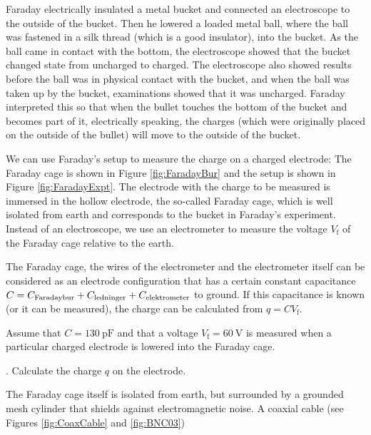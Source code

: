 \documentclass[../Elmag-labhefte-2020.tex]{subfiles}
\begin{document}
Faraday electrically insulated a metal bucket and connected an electroscope to the outside of the bucket. Then he lowered a loaded metal ball, where the ball was fastened in a silk thread (which is a good insulator), into the bucket. As the ball came in contact with the bottom, the electroscope showed that the bucket changed state from uncharged to charged. The electroscope also showed results before the ball was in physical contact with the bucket, and when the ball was taken up by the bucket, examinations showed that it was uncharged. Faraday interpreted this so that when the bullet touches the bottom of the bucket and becomes part of it, electrically speaking, the charges (which were originally placed on the outside of the bullet) will move to the outside of the bucket.

We can use Faraday's setup to measure the charge on a charged electrode: The Faraday cage is shown in Figure \ref{fig:FaradayBur} and the setup is shown in Figure \ref{fig:FaradayExpt}. The electrode with the charge to be measured is immersed in the hollow electrode, the so-called Faraday cage, which is well isolated from earth and corresponds to the bucket in Faraday's experiment. Instead of an electroscope, we use an electrometer to measure the voltage $V_\text{f}$ of the Faraday cage relative to the earth.


The Faraday cage, the wires of the electrometer and the electrometer itself can be considered as an electrode configuration that has a certain constant capacitance $C = C_\text{Faradaybur} + C_{\rm ledninger} + C_\text{elektrometer}$ to ground. If this capacitance is known (or it can be measured), the charge can be calculated from $q = C V_\text{f}$.

Assume that $C = \SI{130}{\pico\farad}$ and that a voltage $V_\text{f} = \SI{60}{\volt}$ is measured when a particular charged electrode is lowered into the Faraday cage.

{. Calculate the charge $q$ on the electrode.}

The Faraday cage itself is isolated from earth, but surrounded by a grounded mesh cylinder that shields against electromagnetic noise. A coaxial cable (see Figures \ref{fig:CoaxCable} and \ref{fig:BNC03})
\end{document}

